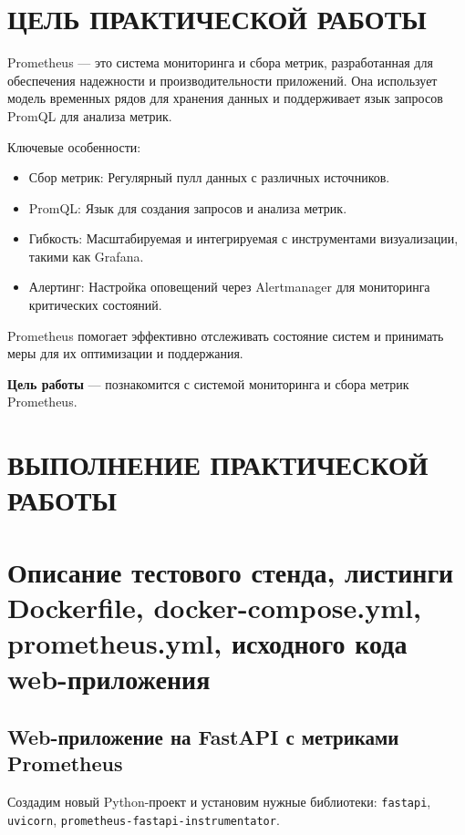 \graphicspath{{./img/}}
\section*{ЦЕЛЬ ПРАКТИЧЕСКОЙ РАБОТЫ}

Prometheus --- это система мониторинга и сбора метрик,
разработанная для обеспечения надежности и производительности приложений.
Она использует модель временных рядов для хранения данных
и поддерживает язык запросов PromQL для анализа метрик.

Ключевые особенности:

\begin{itemize}
    \item Сбор метрик: Регулярный пулл данных с различных источников.
    \item PromQL: Язык для создания запросов и анализа метрик.
    \item Гибкость: Масштабируемая и интегрируемая
    с инструментами визуализации, такими как Grafana.
    \item Алертинг: Настройка оповещений через Alertmanager
    для мониторинга критических состояний.
\end{itemize}

Prometheus помогает эффективно отслеживать состояние систем
и принимать меры для их оптимизации и поддержания.

\textbf{Цель работы} --- познакомится с системой мониторинга
и сбора метрик Prometheus.

\clearpage

\section*{ВЫПОЛНЕНИЕ ПРАКТИЧЕСКОЙ РАБОТЫ}

\section{Описание тестового стенда,
    листинги Dockerfile, docker-compose.yml, prometheus.yml,
    исходного кода web-приложения}

\subsection{Web-приложение на FastAPI с метриками Prometheus}

Создадим новый Python-проект и установим нужные библиотеки:
\texttt{fastapi}, \texttt{uvicorn}, \texttt{prometheus-fastapi-instrumentator}.

